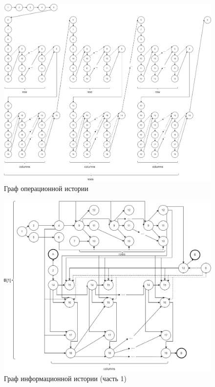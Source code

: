 \documentclass[a4paper,14pt, unknownkeysallowed]{extreport}
\begin{document}
\begin{figure}[h!]
	\centering
	\includegraphics[width=1\linewidth]{img/op_hist.png}
	\caption{Граф операционной истории}
	\label{fig:op_hist}
\end{figure}

\begin{figure}[h!]
	\centering
	\includegraphics[width=1\linewidth]{img/info_hist1.png}
	\caption{Граф информационной истории (часть 1)}
	\label{fig:info_hist1}
\end{figure}
\end{document}
